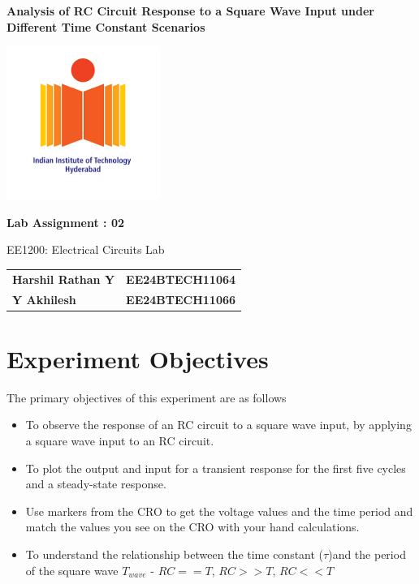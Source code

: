 \documentclass[journal]{IEEEtran}
\begin{document}
\begin{titlepage}
    \centering
    {\Huge \bfseries Analysis of RC Circuit Response to a Square Wave Input under Different Time Constant Scenarios

 \par}
    \vspace{1cm}
    \includegraphics[width=5cm]{IITH.png} 
    \vspace{1cm}
   
    {\Large \bfseries Lab Assignment : 02 \par}
    \vspace{0.5cm}
   
    {\large EE1200: Electrical Circuits Lab \par}
    \vspace{2cm}
   
\begin{tabular}{ll}
    \textbf{Harshil Rathan Y } & \textbf{EE24BTECH11064} \\
    \textbf{Y Akhilesh } & \textbf{EE24BTECH11066} \\
\end{tabular}
\vspace{1cm}
\end{titlepage}
\newpage
\tableofcontents
\newpage


\vspace{3cm}

\renewcommand{\thefigure}{\theenumi}
\renewcommand{\thetable}{\theenumi}
\setlength{\intextsep}{10pt} %


\renewcommand{\thetable}{\theenumi}
\section{\textbf{Experiment Objectives}}
The primary objectives of this experiment are as follows
\begin{itemize}
    \item To observe the response of an RC circuit to a square wave input, by applying a square wave input to an RC circuit.
    \item To plot the output and input for a transient response for the first five cycles and a steady-state response.
    \item Use markers from the CRO to get the voltage values and the time period and match the values you see on the CRO with your hand calculations.
    \item To understand the relationship between the time constant ($\tau$)and the period of the square wave $T_{wave}$ -
    $RC==T$, $RC>>T$, $RC<<T$
\end{itemize}
\end{document}
